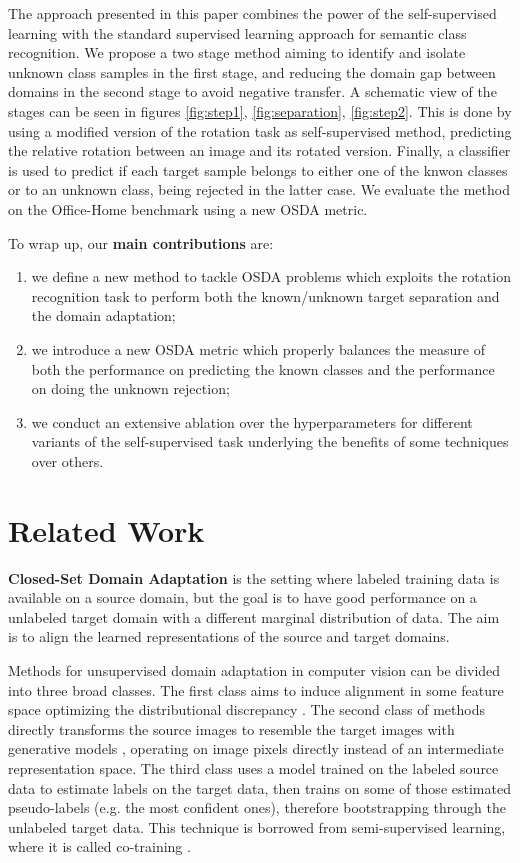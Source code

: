 \documentclass[10pt,twocolumn,letterpaper]{article}
\begin{document}
The approach presented in this paper combines the power of the self-supervised learning with the standard supervised learning approach for semantic class recognition.
We propose a two stage method aiming to identify and isolate unknown class samples in the first stage, 
and reducing the domain gap between domains in the second stage to avoid negative transfer.
A schematic view of the stages can be seen in figures \ref{fig:step1}, \ref{fig:separation}, \ref{fig:step2}.
This is done by using a modified version of the rotation task as self-supervised method,
predicting the relative rotation between an image and its rotated version.
Finally, a classifier is used to predict if each target sample belongs to either one of the knwon classes or to an unknown class, 
being rejected in the latter case.
We evaluate the method on the Office-Home benchmark \cite{OfficeHomeDataset} using a new OSDA metric. 

To wrap up, our \textbf{main contributions} are: 
\begin{enumerate}
  \item we define a new method to tackle OSDA problems which exploits the rotation recognition task to perform both the known/unknown target separation
and the domain adaptation;
  \item we introduce a new OSDA metric which properly balances the measure of both the performance on predicting the known classes and the performance on doing the unknown rejection;
  \item we conduct an extensive ablation over the hyperparameters for different variants of the self-supervised task underlying the benefits of some techniques over others.
\end{enumerate}

\section{Related Work}
\label{sec:relatedwork}
\textbf{Closed-Set Domain Adaptation} is the setting where labeled training data is 
available on a source domain, but the goal is to have good performance on a 
unlabeled target domain with a different marginal distribution
of data. The aim is to align the learned representations of the source and target domains.

Methods for unsupervised domain adaptation in computer vision can be divided into 
three broad classes. The first class aims to induce alignment in some feature space optimizing the distributional discrepancy \cite{bousmalis2016domain,long2015learning,ganin2015unsupervised,hoffman2017cycada}.
The second class of methods directly transforms the source images to resemble 
the target images with generative models \cite{taigman2016unsupervised,tzeng2017adversarial,bousmalis2017unsupervised}, 
operating on image pixels directly instead of an intermediate 
representation space.
The third class uses a model trained on the labeled source data to 
estimate labels on the target data, then trains on some of those estimated 
pseudo-labels (e.g. the most confident ones), therefore bootstrapping through the 
unlabeled target data. This technique is borrowed from semi-supervised learning, 
where it is called co-training \cite{saito2017asymmetric,zou2018domain,chen2017rethinking}.
\end{document}
